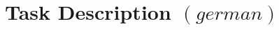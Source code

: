 \documentclass[./\jobname.tex]{subfiles}
\begin{document}
\chapter{Task Description $\left( german \right) $}

\end{document}
